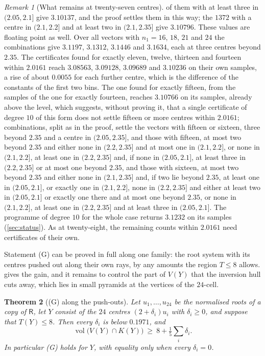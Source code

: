\documentclass[11pt,reqno]{amsart}
\renewcommand{\_}{\origunderscore\allowbreak}
\numberwithin{equation}{section}
\theoremstyle{plain}
\newtheorem{thm}{Theorem}[section]
\theoremstyle{definition}
\theoremstyle{remark}
\newtheorem{remark}[thm]{Remark}
\newcommand{\Rt}{\mathsf{R}}                 %
\DeclareMathOperator{\vol}{vol}
\begin{document}
\begin{remark}[What remains at twenty-seven centres]
of them with at least three in $(2.05,2.1]$ give $3.10137$, and the proof
settles them in this way; the $1372$
with a centre in $(2.1,2.2]$ and at least two in $(2.1,2.35]$ give
$3.10796$. These values are floating point as well. Over all vectors with
$n_1=16$, $18$, $21$ and $24$ the combinations give $3.1197$, $3.1312$,
$3.1446$ and $3.1634$, each at three centres beyond $2.35$. The certificates found for exactly eleven, twelve, thirteen and
fourteen within $2.0161$ reach $3.08563$, $3.09128$, $3.09689$ and
$3.10236$ on their own samples, a rise of about $0.0055$ for each further
centre, which is the difference of the constants of the first two bins.
The one found for exactly fifteen, from the samples of the one for exactly
fourteen, reaches $3.10766$ on its samples, already above the level, which
suggests, without proving it, that a single certificate of degree $10$ of
this form does not settle fifteen or more centres within $2.0161$;
combinations, split as in the proof, settle the vectors with fifteen or
sixteen, three beyond $2.35$ and a centre in $(2.05,2.35]$, and those with
fifteen, at most two beyond $2.35$ and either none in $(2.2,2.35]$ and at most one in $(2.1,2.2]$, or none in $(2.1,2.2]$, at least one in $(2.2,2.35]$ and, if none in $(2.05,2.1]$, at least three in $(2.2,2.35]$ or at most one beyond $2.35$,
and those with sixteen, at most two beyond $2.35$ and either none in $(2.1,2.35]$ and, if two lie beyond $2.35$, at least one in $(2.05,2.1]$, or exactly one in $(2.1,2.2]$, none in $(2.2,2.35]$ and either at least two in $(2.05,2.1]$ or exactly one there and at most one beyond $2.35$, or none in $(2.1,2.2]$, at least one in $(2.2,2.35]$ and at least three in $(2.05,2.1]$. The programme of
degree $10$ for the whole case returns $3.1232$ on its samples
(\cref{sec:status}). As at twenty-eight, the remaining counts within
$2.0161$ need certificates of their own.
\end{remark}

Statement (G) can be proved in full along one family: the root system with
its centres pushed out along their own rays, by any amounts the region
$T\le8$ allows.  gives the gain, and it remains to
control the part of $V(Y)$ that the inversion hull cuts away, which lies in
small pyramids at the vertices of the $24$-cell.

\begin{thm}[(G) along the push-outs]\label{thm:G-pushout}
Let $u_1,\dots,u_{24}$ be the normalised roots of a copy of $\Rt$, let $Y$
consist of the $24$ centres $(2+\delta_i)u_i$ with $\delta_i\ge0$, and
suppose that $T(Y)\le8$. Then every $\delta_i$ is below $0.1971$, and
\[
  \vol\bigl(V(Y)\cap K(Y)\bigr)\ \ge\ 8+\tfrac15\sum_i\delta_i .
\]
In particular (G) holds for $Y$, with equality only when every $\delta_i=0$.
\end{thm}
\end{document}
